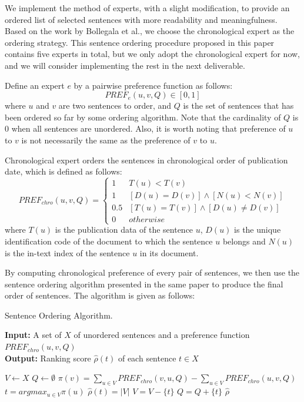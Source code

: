 \documentclass[11pt]{article}
\begin{document}
We implement the method of experts, with a slight modification, to provide an ordered list of selected sentences with more readability and meaningfulness. Based on the work by Bollegala et al., we choose the chronological expert as the ordering strategy\cite{Bollegala:12}. This sentence ordering procedure proposed in this paper contains five experts in total, but we only adopt the chronological expert for now, and we will consider implementing the rest in the next deliverable. 

\indent
Define an expert $e$ by a pairwise preference function as follows:
\begin{equation}
PREF_e(u,v,Q)\in[0,1]
\end{equation}
where $u$ and $v$ are two sentences to order, and $Q$ is the set of sentences that has been ordered so far by some ordering algorithm. Note that the cardinality of $Q$ is 0 when all sentences are unordered. Also, it is worth noting that preference of $u$ to $v$ is not necessarily the same as the preference of $v$ to $u$. 

\indent
Chronological expert orders the sentences in chronological order of publication date, which is defined as follows:
\tiny
\begin{equation}
PREF_{chro}(u,v,Q)=\begin{cases}
				1 & T(u) < T(v)\\
				1 & [D(u)=D(v)]\wedge[N(u)<N(v)]\\
				0.5 & [T(u)=T(v)]\wedge[D(u)\ne D(v)]\\
				0 & otherwise
				\end{cases}
\end{equation}
\normalsize
where $T(u)$ is the publication data of the sentence $u$, $D(u)$ is the unique identification code of the document to which the sentence $u$ belongs and $N(u)$ is the in-text index of the sentence $u$ in its document.

\indent
By computing chronological preference of every pair of sentences, we then use the sentence ordering algorithm presented in the same paper to produce the final order of sentences. The algorithm is given as follows:

\begin{algorithm}
\caption{Sentence Ordering Algorithm.}\label{euclid}
 \hspace*{\algorithmicindent} \textbf{Input:} A set of $X$ of unordered sentences and a preference function $PREF_{chro}(u,v,Q)$\\
 \hspace*{\algorithmicindent} \textbf{Output:} Ranking score $\hat{\rho}{(t)}$ of each sentence $t\in X$
\begin{algorithmic}[1]
\State $V \gets X$
\State $Q \gets \emptyset$
\State $\pi(v)=\sum_{u\in V}PREF_{chro}(v,u,Q)-\sum_{u\in V}PREF_{chro}(u,v,Q)$
\EndFor
{}
\State $t=argmax_{u\in V}\pi(u)$
\State $\hat{\rho}(t)=|V|$
\State $V=V-\{t\}$
\State $Q=Q+\{t\}$
\EndFor
\EndWhile
\Return $\hat{\rho}$
\EndProcedure
\end{algorithmic}
\end{algorithm}
\end{document}

